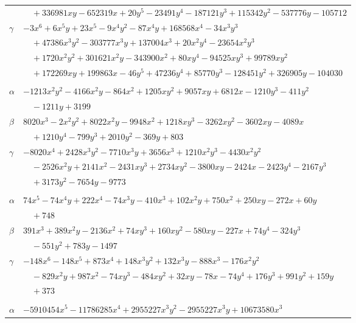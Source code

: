 \documentclass[11pt]{article}
\begin{document}
\begin{longtable}{@{}ll@{}}
 & $\quad +336981xy-652319x+20y^{5}-23491y^{4}-187121y^{3}+115342y^{2}-537776y-105712$\\
$\gamma$ & $-3x^{6}+6x^{5}y+23x^{5}-9x^{4}y^{2}-87x^{4}y+168568x^{4}-34x^{3}y^{3}$\\
 & $\quad +47386x^{3}y^{2}-303777x^{3}y+137004x^{3}+20x^{2}y^{4}-23654x^{2}y^{3}$\\
 & $\quad +1720x^{2}y^{2}+301621x^{2}y-343900x^{2}+80xy^{4}-94525xy^{3}+99789xy^{2}$\\
 & $\quad +172269xy+199863x-46y^{5}+47236y^{4}+85770y^{3}-128451y^{2}+326905y-104030$\\
\addlinespace[3pt]
\multicolumn{2}{@{}l}{$\{i,j\}=\{23,159\}$, $k_{ij}=2^{5}\cdot 5^{2}\cdot 13$}\\
$\alpha$ & $-1213x^{2}y^{2}-4166x^{2}y-864x^{2}+1205xy^{2}+9057xy+6812x-1210y^{3}-411y^{2}$\\
 & $\quad -1211y+3199$\\
$\beta$ & $8020x^{3}-2x^{2}y^{2}+8022x^{2}y-9948x^{2}+1218xy^{3}-3262xy^{2}-3602xy-4089x$\\
 & $\quad +1210y^{4}-799y^{3}+2010y^{2}-369y+803$\\
$\gamma$ & $-8020x^{4}+2428x^{3}y^{2}-7710x^{3}y+3656x^{3}+1210x^{2}y^{3}-4430x^{2}y^{2}$\\
 & $\quad -2526x^{2}y+2141x^{2}-2431xy^{3}+2734xy^{2}-3800xy-2424x-2423y^{4}-2167y^{3}$\\
 & $\quad +3173y^{2}-7654y-9773$\\
\addlinespace[3pt]
\multicolumn{2}{@{}l}{$\{i,j\}=\{23,160\}$, $k_{ij}=2^{5}\cdot 5\cdot 7$}\\
$\alpha$ & $74x^{5}-74x^{4}y+222x^{4}-74x^{3}y-410x^{3}+102x^{2}y+750x^{2}+250xy-272x+60y$\\
 & $\quad +748$\\
$\beta$ & $391x^{3}+389x^{2}y-2136x^{2}+74xy^{3}+160xy^{2}-580xy-227x+74y^{4}-324y^{3}$\\
 & $\quad -551y^{2}+783y-1497$\\
$\gamma$ & $-148x^{6}-148x^{5}+873x^{4}+148x^{3}y^{2}+132x^{3}y-888x^{3}-176x^{2}y^{2}$\\
 & $\quad -829x^{2}y+987x^{2}-74xy^{3}-484xy^{2}+32xy-78x-74y^{4}+176y^{3}+991y^{2}+159y$\\
 & $\quad +373$\\
\addlinespace[3pt]
\multicolumn{2}{@{}l}{$\{i,j\}=\{25,26\}$, $k_{ij}=2^{10}\cdot 3\cdot 5^{2}\cdot 13$}\\
$\alpha$ & $-5910454x^{5}-11786285x^{4}+2955227x^{3}y^{2}-2955227x^{3}y+10673580x^{3}$\\

\end{longtable}
\end{document}
